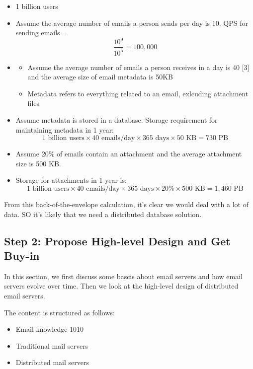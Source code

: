 \documentclass{report}
\theoremstyle{definition}
\let\oldsubsection\subsection
\renewcommand{\subsection}{\oldsubsection*}
\begin{document}
\begin{itemize}
\item
1 billion users
\item
Assume the average number of emails a person sends per day is 10. QPS for sending emails = \[\frac{10^{9}}{10^{5}} = 100,000 \]
\item

\begin{itemize}
\item
Assume the average number of emails a person receives in a day is 40 [3] and the average size of email metadata is 50KB
\item
Metadata refers to everything related to an email, exlcuding attachment files
\end{itemize}

\item
Assume metadata is stored in a database. Storage requirement for maintaining metadata in 1 year: \[ 1 \text{ billion users} \times 40 \text{ emails/day} \times 365 \text{ days} \times 50 \text{ KB} = 730 \text{ PB}\]
\item
Assume 20\% of emails contain an attachment and the average attachment size is 500 KB.
\item
Storage for attachments in 1 year is: \[ 1\text{ billion users} \times 40 \text{ emails/day} \times 365 \text{ days} \times 20\% \times 500 \text{ KB} = 1,460 \text{ PB}\]
\end{itemize}

From this back-of-the-envelope calculation, it's clear we would deal with a lot of data. SO it's likely that we need a distributed database solution.

\subsection{Step 2: Propose High-level Design and Get Buy-in}

In this section, we first discuss some bascis about email servers and how email servers evolve over time. Then we look at the high-level design of distributed email servers.

The content is structured as follows:

\begin{itemize}
\item
Email knowledge 1010
\item
Traditional mail servers
\item
Distributed mail servers
\end{itemize}
\end{document}
